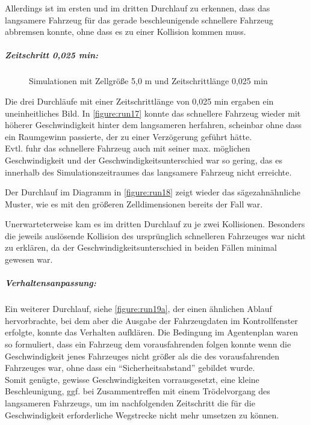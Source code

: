 Allerdings ist im ersten und im dritten Durchlauf zu erkennen, dass das langsamere Fahrzeug für das gerade beschleunigende schnellere Fahrzeug abbremsen konnte, ohne dass es zu einer Kollision kommen muss. 

\subparagraph*{Zeitschritt 0,025 min:}
\begin{figure}[hptb]
  \centering 
   \qquad 
   \qquad 
  \caption{Simulationen mit Zellgröße 5,0 m und Zeitschrittlänge 0,025 min} 
  \label{figure:run17-19}
\end{figure}

Die drei Durchläufe mit einer Zeitschrittlänge von 0,025 min ergaben ein uneinheitliches Bild.
In \cref{figure:run17} konnte das schnellere Fahrzeug wieder mit höherer Geschwindigkeit hinter dem langsameren herfahren, scheinbar ohne dass ein Raumgewinn passierte, der zu einer Verzögerung geführt hätte.
\\
Evtl. fuhr das schnellere Fahrzeug auch mit seiner max. möglichen Geschwindigkeit und der Geschwindigkeitsunterschied war so gering, das es innerhalb des Simulationszeitraumes das langsamere Fahrzeug nicht erreichte.

Der Durchlauf im Diagramm in \cref{figure:run18} zeigt wieder das sägezahnähnliche Muster, wie es mit den größeren Zelldimensionen bereits der Fall war.

Unerwarteterweise kam es im dritten Durchlauf zu je zwei Kollisionen.
Besonders die jeweils auslösende Kollision des ursprünglich schnelleren Fahrzeuges war nicht zu erklären, da der Geschwindigkeitsunterschied in beiden Fällen minimal gewesen war.

\subparagraph*{Verhaltensanpassung:}
Ein weiterer Durchlauf, siehe \cref{figure:run19a}, der einen ähnlichen Ablauf hervorbrachte, bei dem aber die Ausgabe der Fahrzeugdaten im Kontrollfenster erfolgte, konnte das Verhalten aufklären.
Die Bedingung im Agentenplan waren so formuliert, dass ein Fahrzeug dem vorausfahrenden folgen konnte wenn die Geschwindigkeit jenes Fahrzeuges nicht größer als die des vorausfahrenden Fahrzeuges war, ohne dass ein \enquote{Sicherheitsabstand} gebildet wurde. 
\\
Somit genügte, gewisse Geschwindigkeiten vorrausgesetzt, eine kleine Beschleunigung, ggf. bei Zusammentreffen mit einem Trödelvorgang des langsameren Fahrzeugs, um im nachfolgenden Zeitschritt die für die Geschwindigkeit erforderliche Wegstrecke nicht mehr umsetzen zu können.

